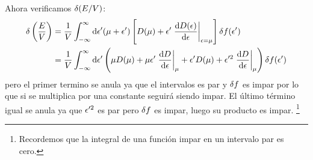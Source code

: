 Ahora verificamos $\delta (E/V)$:
\begin{align}
  \d\left(\frac{E}{V}\right)&=\frac{1}{V}\int_{-\infty}^\infty\dd\ep'(\m+\ep')\left[D(\m )+\ep'\eval{\dv{D(\ep)}{\epsilon}}_{\ep=\m }\right]\d f(\ep ')\\
  &=\frac{1}{V}\int_{-\infty}^\infty\dd\ep'\left(\m D(\m )+\m \ep'\eval{\dv{D	}{\ep }}_{\m }+\ep' D(\m )+\ep'^2\eval{\dv{D}{\ep}}_\m \right)\d f(\ep' )
\end{align}
pero el primer termino se anula ya que el intervalos es par y $\delta f$ es impar por lo que si se multiplica por una constante seguirá siendo impar. El último término igual se anula ya que $\epsilon'^2$ es par pero $\delta f$ es impar, luego su producto es impar. \footnote{Recordemos que la integral de una función impar en un intervalo par es cero.}
















